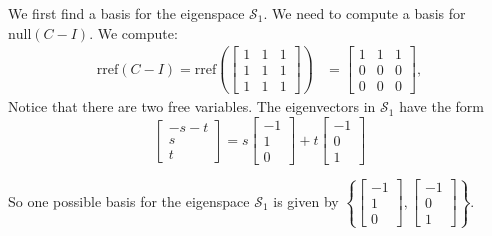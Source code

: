 \documentclass{ximera}
\begin{document}
\begin{explanation}
We first find a basis for the eigenspace $\mathcal{S}_1$.  We need to compute a basis for $\mbox{null}(C-I)$.  We compute:
\begin{align*}\mbox{rref}(C-I)=\mbox{rref}\left(\begin{bmatrix} 1 & 1 & 1\\ 1 & 1 & 1\\ 1 & 1 & 1\end{bmatrix}\right)&=\begin{bmatrix} 1 & 1 & 1\\ 0 & 0 & 0\\ 0 & 0 & 0\end{bmatrix},
\end{align*}
Notice that there are two free variables.  %
The eigenvectors in $\mathcal{S}_1$ have the form
$$\begin{bmatrix}-s-t\\s\\t\end{bmatrix} = s\begin{bmatrix}-1\\1\\0\end{bmatrix} + t\begin{bmatrix}-1\\0\\1\end{bmatrix}$$

So one possible basis for the eigenspace $\mathcal{S}_1$ is given by $\left\{\begin{bmatrix}-1\\1\\0\end{bmatrix}, \begin{bmatrix}-1\\0\\1\end{bmatrix}\right\}$.


\end{explanation}
\end{document}
